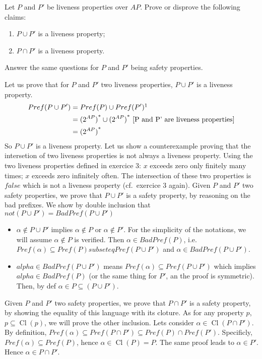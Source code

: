 \documentclass[11pt,a4paper]{article}
\DeclareMathOperator{\Cl}{Cl}
\begin{document}
\begin{Exercise}
Let $P$ and $P'$ be liveness properties over $AP$. Prove or disprove the following claims:
\begin{enumerate}
\item $P \cup P'$ is a liveness property;
\item $P \cap P'$ is a liveness property.
\end{enumerate}
Answer the same questions for $P$ and $P'$ being safety properties.
\end{Exercise}

\begin{Answer}
\Question%
Let us prove that for $P$ and $P'$ two liveness properties, $P \cup P'$ is a liveness property.
\begin{align*}Pref(P \cup P') &= Pref(P) \cup Pref(P')\footnotemark[1]\\
                              &= {(2^{AP})}^* \cup {(2^{AP})}^* \text{ [P and P' are liveness properties]}\\
                              &= {(2^{AP})}^*
\end{align*}
So $P \cup P'$ is a liveness property.
\Question%
Let us show a counterexample proving that the intersetion of two liveness properties is not always a liveness property.
Using the two liveness properties defined in exercice 3: $x$ exceeds zero only finitely many times; $x$ exceeds zero infinitely often.
The intersection of these two properties is $false$ which is not a liveness property (cf.\ exercice 3 again).
\Question%
Given $P$ and $P'$ two safety properties, we prove that $P\cup P'$ is a safety property, by reasoning on the bad prefixes. We show by double inclusion that $ not( P\cup P') = BadPref( P\cup P')$
\begin{itemize}
\item $\alpha \notin P\cup P'$ implies $\alpha \notin P$ or $\alpha \notin P'$.
For the simplicity of the notations, we will assume $\alpha \notin P$ is verified. Then $\alpha \in BadPref(P)$, i.e. $Pref(\alpha) \subseteq Pref(P) subseteq Pref(P \cup P')$ and $\alpha \in BadPref(P \cup P')$.
\item $alpha \in BadPref(P\cup P')$ means $Pref(\alpha) \subseteq Pref(P \cup P')$ which implies $alpha \in BadPref(P)$ (or the same thing for $P'$, an the proof is symmetric). Then, by def $\alpha \in P \subseteq (P \cup P')$.
\end{itemize}
\Question%
Given $P$ and $P'$ two safety properties, we prove that $P\cap P'$ is a safety property, by showing the equality of this language with its cloture.
As for any property $p$, $p \subseteq \Cl(p)$, we will prove the other inclusion. Lets consider $\alpha \in \Cl(P\cap P')$. By definition, $Pref(\alpha) \subseteq Pref(P\cap P') \subseteq Pref(P) \cap Pref(P')$\footnotemark[2].
Specificly, $Pref(\alpha) \subseteq Pref(P)$, hence $\alpha \in \Cl(P) = P$. The same proof leads to $\alpha \in P'$. Hence $\alpha \in P\cap P'$.



\end{Answer}
\end{document}
